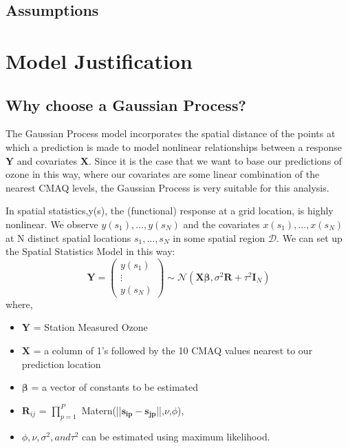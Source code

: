 \documentclass{article}                                                   %
\def\wl{\par \vspace{\baselineskip}}                                      %
\begin{document}
  \subsection{Assumptions}
\section{Model Justification}
  \subsection{Why choose a Gaussian Process?}
  The Gaussian Process model incorporates the spatial distance of the points 
  at which a prediction is made to model nonlinear relationships between a
  response $\bm Y$ and covariates $\bm X$. Since it is the case that we want
  to base our predictions of ozone in this way, where our covariates are some
  linear combination of the nearest CMAQ levels, the Gaussian Process is very
  suitable for this analysis.
  \wl\noindent
  In spatial statistics,y(s), the (functional) response at a grid location,
  is highly nonlinear. We observe $y(s_1),\ldots,y(s_N)$ and the covariates
  $x(s_1),\ldots,x(s_N)$ at N distinct spatial locations $s_1,\ldots,s_N$
  in some spatial region $\mathcal{D}$.
  We can set up the Spatial Statistics Model in this way:
  \[ \bm Y = \begin{pmatrix} y(s_1) \\ \vdots \\ y(s_N) \end{pmatrix} 
             \sim \mathcal{N}(\bm{X\beta},\sigma^2\bm R + \tau^2\bm I_N) \] 
  where,  \begin{itemize}
            \item $\bm Y$ = Station Measured Ozone
            \item $\bm X$ = a column of 1's followed by the 10 CMAQ values 
                            nearest to our prediction location
            \item $\bm\beta$ = a vector of constants to be estimated
            \item $\bm R_{ij}$ = $\prod_{p=1}^P$ 
                                 Matern(||$\bm{s_{ip}-s_{jp}}$||,$\nu$,$\phi$), 
            \item $\phi,\nu,\sigma^2, and \tau^2$ can be estimated using 
                                                  maximum likelihood.
          \end{itemize}
         
\end{document}
